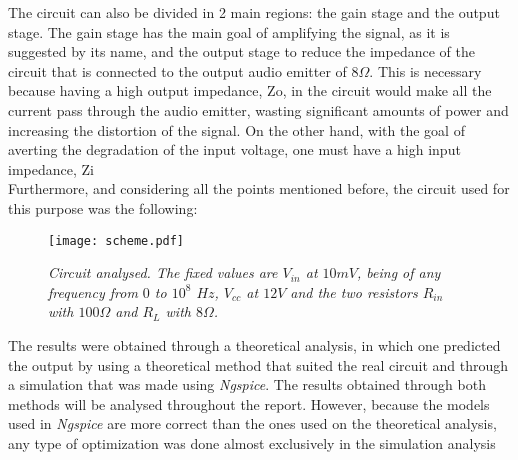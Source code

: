 The circuit can also be divided in 2 main regions: the gain stage and the output stage. The gain stage has the main goal of amplifying the signal, as it is suggested by its name, and the output stage to reduce the impedance of the circuit that is connected to the output audio emitter of $8 \Omega$. This is necessary because having a high output impedance, Zo, in the circuit would make all the current pass through the audio emitter, wasting significant amounts of power and increasing the distortion of the signal. On the other hand, with the goal of averting the degradation of the input voltage, one must have a high input impedance, Zi\\

Furthermore, and considering all the points mentioned before, the circuit used for this purpose was the following:

\begin{figure}[H]
    \centering
    \texttt{[image: scheme.pdf]}
            \caption{\textit{Circuit analysed. The fixed values are $V_{in}$ at $10mV$, being of any frequency from $0$ to $10^8$ $Hz$, $V_{cc}$ at $12V$ and the two resistors $R_{in}$ with $100\Omega$ and $R_L$ with $8\Omega$.}}
    \label{fig:bigscheme}
\end{figure}

The results were obtained through a theoretical analysis, in which one predicted the output by using a theoretical method that suited the real circuit and through a simulation that was made using \textit{Ngspice}. The results obtained through both methods will be analysed throughout the report. However, because the models used in \textit{Ngspice} are more correct than the ones used on the theoretical analysis, any type of optimization was done almost exclusively in the simulation analysis\\